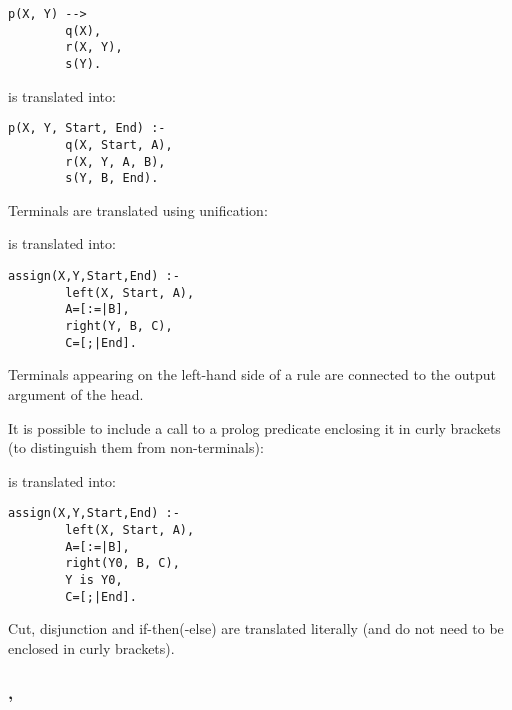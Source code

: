 \begin{Indentation}
\begin{verbatim}
p(X, Y) -->
        q(X),
        r(X, Y),
        s(Y).
\end{verbatim}
\end{Indentation}

is translated into:

\begin{Indentation}
\begin{verbatim}
p(X, Y, Start, End) :-
        q(X, Start, A),
        r(X, Y, A, B),
        s(Y, B, End).
\end{verbatim}
\end{Indentation}

Terminals are translated using unification:


is translated into:

\begin{Indentation}
\begin{verbatim}
assign(X,Y,Start,End) :-
        left(X, Start, A),
        A=[:=|B],
        right(Y, B, C),
        C=[;|End].
\end{verbatim}
\end{Indentation}

Terminals appearing on the left-hand side of a rule are connected to the
output argument of the head.

It is possible to include a call to a prolog predicate enclosing it in curly
brackets (to distinguish them from non-terminals):


is translated into:

\begin{Indentation}
\begin{verbatim}
assign(X,Y,Start,End) :-
        left(X, Start, A),
        A=[:=|B],
        right(Y0, B, C),
        Y is Y0,
        C=[;|End].
\end{verbatim}
\end{Indentation}

Cut, disjunction and if-then(-else) are translated literally (and do not need
to be enclosed in curly brackets).

\subsubsection{,\label{expand-term/2}
               }


